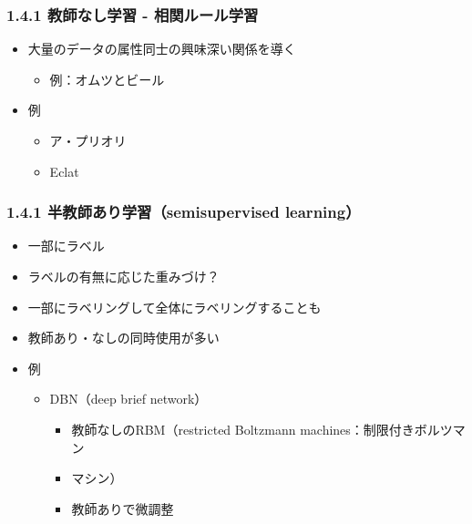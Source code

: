 \documentclass[aspectratio=169, dvipdfmx, 14pt, xcolor={svgnames,dvipsnames}]{beamer}
\def\tightlist{\itemsep1pt\parskip0pt\parsep0pt}
\begin{document}

\begin{frame}
  \frametitle{1.4.1 教師なし学習 - 相関ルール学習}
  \begin{itemize}
    \tightlist
    \item
          大量のデータの属性同士の興味深い関係を導く

          \begin{itemize}
            \tightlist
            \item
                  例：オムツとビール
          \end{itemize}
    \item
          例

          \begin{itemize}
            \tightlist
            \item
                  ア・プリオリ
            \item
                  Eclat
          \end{itemize}
  \end{itemize}
\end{frame}


\begin{frame}
  \frametitle{1.4.1 半教師あり学習（semisupervised learning）}
  \begin{itemize}
    \tightlist
    \item
          一部にラベル
    \item
          ラベルの有無に応じた重みづけ？
    \item
          一部にラベリングして全体にラベリングすることも
    \item
          教師あり・なしの同時使用が多い
    \item
          例

          \begin{itemize}
            \tightlist
            \item
                  DBN（deep brief network）

                  \begin{itemize}
                    \tightlist
                    \item
                          教師なしのRBM（restricted Boltzmann machines：制限付きボルツマン
                    \item
                          マシン）
                    \item
                          教師ありで微調整
                  \end{itemize}
          \end{itemize}
  \end{itemize}
\end{frame}
\end{document}
